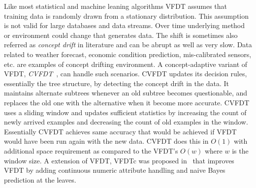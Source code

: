 Like most statistical and machine leaning algorithms VFDT assumes that training data is randomly drawn from a stationary distribution. This assumption is not valid for large databases and data streams. Over time underlying method or environment could change that generates data. The shift is sometimes also referred as {\it concept drift} in literature and can be abrupt as well as very slow. Data related to weather forecast, economic condition prediction, mis-calibrated sensors, etc. are examples of concept drifting environment. A concept-adaptive variant of VFDT, \textit{CVFDT}~\cite{hulten01:cvfdt}, can handle such scenarios. CVFDT updates its decision rules, essentially the tree structure, by detecting the concept drift in the data. It maintains alternate subtrees whenever an old subtree becomes questionable, and replaces the old one with the alternative when it become more accurate. CVFDT uses a sliding window and updates sufficient statistics by increasing the count of newly arrived examples and decreasing the count of old examples in the window. Essentially CVFDT achieves same accuracy that would be achieved if VFDT would have been run again with the new data. CVFDT does this in $O(1)$ with additional space requirement as compared to the VFDT's $O(w)$ where $w$ is the window size. A extension of VFDT, VFDTc was proposed in~\cite{gama05:vfdtc} that improves VFDT by adding continuous numeric attribute handling and naive Bayes prediction at the leaves.



